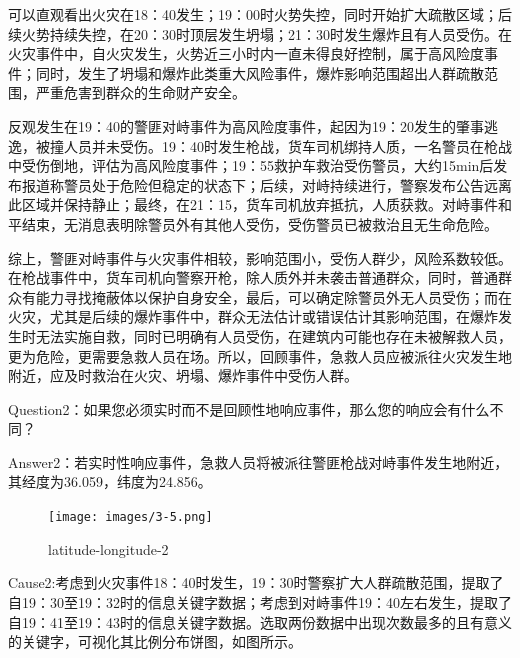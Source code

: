 \documentclass[a4paper]{article}
\begin{document}
可以直观看出火灾在18：40发生；19：00时火势失控，同时开始扩大疏散区域；后续火势持续失控，在20：30时顶层发生坍塌；21：30时发生爆炸且有人员受伤。在火灾事件中，自火灾发生，火势近三小时内一直未得良好控制，属于高风险度事件；同时，发生了坍塌和爆炸此类重大风险事件，爆炸影响范围超出人群疏散范围，严重危害到群众的生命财产安全。

反观发生在19：40的警匪对峙事件为高风险度事件，起因为19：20发生的肇事逃逸，被撞人员并未受伤。19：40时发生枪战，货车司机绑持人质，一名警员在枪战中受伤倒地，评估为高风险度事件；19：55救护车救治受伤警员，大约15min后发布报道称警员处于危险但稳定的状态下；后续，对峙持续进行，警察发布公告远离此区域并保持静止；最终，在21：15，货车司机放弃抵抗，人质获救。对峙事件和平结束，无消息表明除警员外有其他人受伤，受伤警员已被救治且无生命危险。

综上，警匪对峙事件与火灾事件相较，影响范围小，受伤人群少，风险系数较低。在枪战事件中，货车司机向警察开枪，除人质外并未袭击普通群众，同时，普通群众有能力寻找掩蔽体以保护自身安全，最后，可以确定除警员外无人员受伤；而在火灾，尤其是后续的爆炸事件中，群众无法估计或错误估计其影响范围，在爆炸发生时无法实施自救，同时已明确有人员受伤，在建筑内可能也存在未被解救人员，更为危险，更需要急救人员在场。所以，回顾事件，急救人员应被派往火灾发生地附近，应及时救治在火灾、坍塌、爆炸事件中受伤人群。

Question2：如果您必须实时而不是回顾性地响应事件，那么您的响应会有什么不同？

Answer2：若实时性响应事件，急救人员将被派往警匪枪战对峙事件发生地附近，其经度为36.059，纬度为24.856。

\begin{figure}[H]
    \centering
    \texttt{[image: images/3-5.png]}
    \caption{latitude-longitude-2}\label{fig:3-5}
    \vspace{\baselineskip}
\end{figure}

Cause2:考虑到火灾事件18：40时发生，19：30时警察扩大人群疏散范围，提取了自19：30至19：32时的信息关键字数据；考虑到对峙事件19：40左右发生，提取了自19：41至19：43时的信息关键字数据。选取两份数据中出现次数最多的且有意义的关键字，可视化其比例分布饼图，如图所示。
\end{document}
